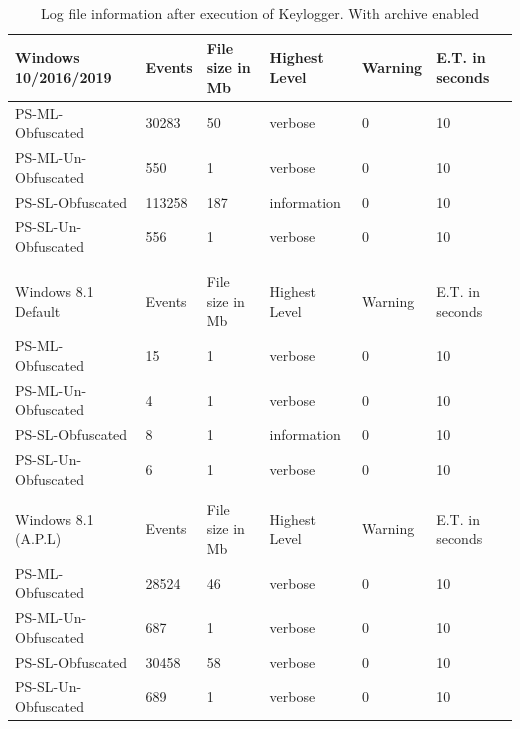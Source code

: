 \documentclass{article}%
\begin{document}
\begin{table}
\begin{center}
\caption {Log file information after execution of Keylogger. With archive enabled}
\label{tab:table_seven}
\begin{tabular}{|l|l|l|l|l|l|}\hline
Windows 10/2016/2019 & Events & File size in Mb & Highest Level & Warning & E.T. in seconds  \\\hline
PS-ML-Obfuscated     & 30283  & 50              & verbose       & 0       & 10               \\\hline
PS-ML-Un-Obfuscated  & 550    & 1               & verbose       & 0       & 10               \\\hline
PS-SL-Obfuscated     & 113258 & 187             & information   & 0       & 10               \\\hline
PS-SL-Un-Obfuscated  & 556    & 1               & verbose       & 0       & 10               \\\hline
                     &        &                 &               &         &                  \\\hline
                     &        &                 &               &         &                  \\\hline
Windows 8.1 Default  & Events & File size in Mb & Highest Level & Warning & E.T. in seconds  \\\hline
PS-ML-Obfuscated     & 15     & 1               & verbose       & 0       & 10               \\\hline
PS-ML-Un-Obfuscated  & 4      & 1               & verbose       & 0       & 10               \\\hline
PS-SL-Obfuscated     & 8      & 1               & information   & 0       & 10               \\\hline
PS-SL-Un-Obfuscated  & 6      & 1               & verbose       & 0       & 10               \\\hline
                     &        &                 &               &         &                  \\\hline
Windows 8.1 (A.P.L)  & Events & File size in Mb & Highest Level & Warning & E.T. in seconds  \\\hline
PS-ML-Obfuscated     & 28524  & 46              & verbose       & 0       & 10               \\\hline
PS-ML-Un-Obfuscated  & 687    & 1               & verbose       & 0       & 10               \\\hline
PS-SL-Obfuscated     & 30458  & 58              & verbose       & 0       & 10               \\\hline
PS-SL-Un-Obfuscated  & 689    & 1               & verbose       & 0       & 10               \\\hline
\end{tabular}
\end{center}
\end{table}
\end{document}
